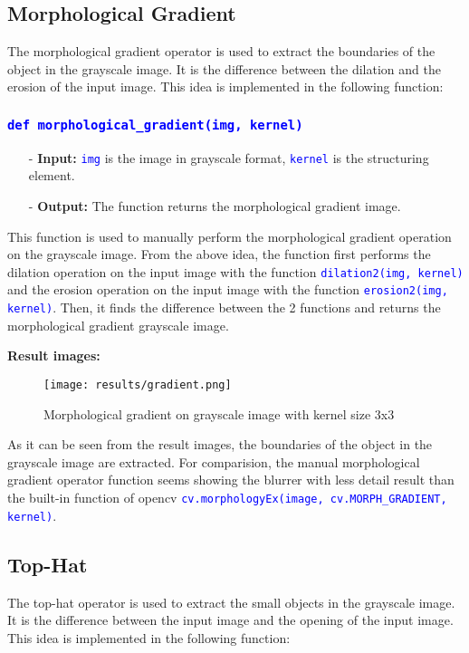 \documentclass{report}
\begin{document}
\pagebreak
\subsection{Morphological Gradient}
The morphological gradient operator is used to extract the boundaries of the object in the grayscale image. It is the difference between the dilation and the erosion of the input image. This idea is implemented in the following function:

\subsubsection*{\textcolor{blue}{\lstinline|def morphological_gradient(img, kernel)|}}

\begin{itemize}
  \item[-] \textbf{Input:} \textcolor{blue}{\lstinline|img|} is the image in grayscale format, \textcolor{blue}{\lstinline|kernel|} is the structuring element.
  \item[-] \textbf{Output:} The function returns the morphological gradient image.
\end{itemize}

This function is used to manually perform the morphological gradient operation on the grayscale image. From the above idea, the function first performs the dilation operation on the input image with the function \textcolor{blue}{\lstinline|dilation2(img, kernel)|} and the erosion operation on the input image with the function \textcolor{blue}{\lstinline|erosion2(img, kernel)|}. Then, it finds the difference between the 2 functions and returns the morphological gradient grayscale image.

\textbf{Result images:}
\begin{figure}[H]
    \centering
    \texttt{[image: results/gradient.png]}
    \caption{Morphological gradient on grayscale image with kernel size 3x3}
\end{figure}

As it can be seen from the result images, the boundaries of the object in the grayscale image are extracted. For comparision, the manual morphological gradient operator function seems showing the blurrer with less detail result than the built-in function of opencv \textcolor{blue}{\lstinline|cv.morphologyEx(image, cv.MORPH_GRADIENT, kernel)|}.

\pagebreak
\subsection{Top-Hat}
The top-hat operator is used to extract the small objects in the grayscale image. It is the difference between the input image and the opening of the input image. This idea is implemented in the following function:
\end{document}
